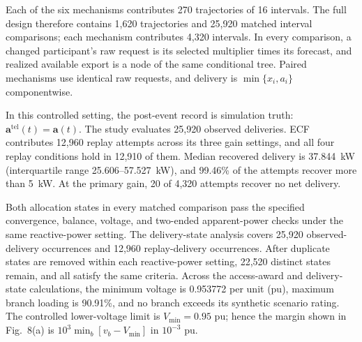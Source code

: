 \documentclass[11pt]{article}
\begin{document}
Each of the six mechanisms contributes 270 trajectories of 16 intervals. The
full design therefore contains 1,620 trajectories and 25,920 matched interval
comparisons; each mechanism contributes 4,320 intervals. In every comparison, a
changed participant's raw request is its selected multiplier times its forecast,
and realized available export is a node of the same conditional tree. Paired
mechanisms use identical raw requests, and delivery is
$\min\{x_i,a_i\}$ componentwise.

In this controlled setting, the post-event record is simulation truth:
$\mathbf a^{\mathrm{tel}}(t)=\mathbf a(t)$. The study evaluates 25,920 observed
deliveries. ECF contributes 12,960 replay attempts across its three gain
settings, and all four replay conditions hold in 12,910 of them. Median
recovered delivery is 37.844~kW (interquartile range 25.606--57.527~kW),
and 99.46\% of the attempts recover more than 5~kW. At the primary gain,
20 of 4,320 attempts recover no net delivery.

Both allocation states in every matched comparison pass the specified
convergence, balance, voltage, and two-ended apparent-power checks under the
same reactive-power setting.
The delivery-state analysis covers 25,920 observed-delivery occurrences and
12,960 replay-delivery occurrences. After duplicate states are removed within
each reactive-power setting, 22,520 distinct states remain, and all satisfy the
same criteria. Across the access-award and delivery-state calculations, the
minimum voltage is 0.953772 per unit (pu), maximum branch loading is 90.91\%,
and no branch exceeds its synthetic scenario rating.
The controlled lower-voltage limit is $V_{\min}=0.95$ pu; hence the margin shown
in Fig.~8(a) is $10^3\min_b[v_b-V_{\min}]$ in $10^{-3}$ pu.
\end{document}

